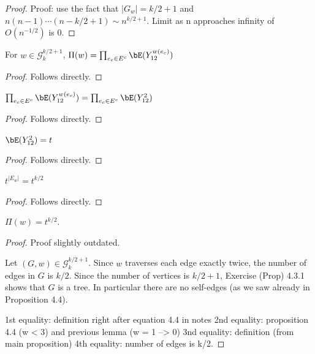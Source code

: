 \begin{proof}
  \notready
  Proof: use the fact that $|G_w|=k/2+1$ and $n(n-1)\cdots(n-k/2+1) \sim n^{k/2+1}$. Limit as n approaches infinity of $O(n^{-1/2})$ is 0.
\end{proof}


\begin{lemma}
  \label{lem:prod_expansion}
  \notready
  For $w\in\mathcal{G}^{k/2+1}_k$, $\Pi(w) = \prod_{e_c\in E^c} \bE(Y_{12}^{w(e_c)})$
\end{lemma}

\begin{proof}
  \notready
  Follows directly.
\end{proof}


\begin{lemma}
  \label{lem:w_2_case}
  \notready
  $\prod_{e_c\in E^c} \bE(Y_{12}^{w(e_c)}) = \prod_{e_c\in E^c} \bE(Y_{12}^2)$
\end{lemma}

\begin{proof}
  \notready
  Follows directly.
\end{proof}


\begin{lemma}
  \label{lem:def_t_rewrite}
  \notready
  \uses{}
  $\bE(Y_{12}^2) = t$
\end{lemma}

\begin{proof}
  \notready
  Follows directly.
\end{proof}


\begin{lemma}
  \label{lem:e_equals_k_over_two}
  \notready
  $t^{|E_w|} = t^{k/2}$
\end{lemma}

\begin{proof}
  \notready
  Follows directly.
\end{proof}


\begin{proposition}%
  \label{prop:product_g_w_to_exponential}
  \notready
  $\Pi(w) = t^{k/2}$.
\end{proposition}

\begin{proof}
  \notready
  Proof slightly outdated.

  Let $(G,w)\in\mathcal{G}^{k/2+1}_k$.  Since $w$ traverses each edge exactly twice, the number of edges in $G$ is $k/2$.  Since the number of vertices is $k/2+1$, Exercise (Prop) 4.3.1 shows that $G$ is a tree.  In particular there are no self-edges (as we saw already in Proposition 4.4).

  1st equality: definition right after equation 4.4 in notes
  2nd equality: proposition 4.4 (w < 3) and previous lemma (w = 1 --> 0)
  3nd equality: definition (from main proposition)
  4th equality: number of edges is k/2.
\end{proof}



